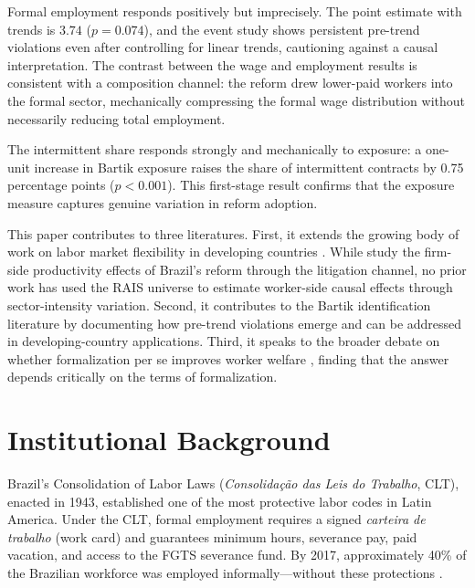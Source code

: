 \documentclass[12pt]{article}
\begin{document}
Formal employment responds positively but imprecisely. The point estimate with trends is $3.74$ ($p = 0.074$), and the event study shows persistent pre-trend violations even after controlling for linear trends, cautioning against a causal interpretation. The contrast between the wage and employment results is consistent with a composition channel: the reform drew lower-paid workers into the formal sector, mechanically compressing the formal wage distribution without necessarily reducing total employment.

The intermittent share responds strongly and mechanically to exposure: a one-unit increase in Bartik exposure raises the share of intermittent contracts by 0.75 percentage points ($p < 0.001$). This first-stage result confirms that the exposure measure captures genuine variation in reform adoption.

This paper contributes to three literatures. First, it extends the growing body of work on labor market flexibility in developing countries \citep{Botero2004, Besley2004, Heckman2004, Djankov2002}. While \citet{HannanPienknagura2025} study the firm-side productivity effects of Brazil's reform through the litigation channel, no prior work has used the RAIS universe to estimate worker-side causal effects through sector-intensity variation. Second, it contributes to the Bartik identification literature \citep{Bartik1991, GoldsmithPinkham2020, BorusyakHullJaravel2022, Adao2019} by documenting how pre-trend violations emerge and can be addressed in developing-country applications. Third, it speaks to the broader debate on whether formalization per se improves worker welfare \citep{LaPortaShleifer2014, Ulyssea2018, Meghir2015}, finding that the answer depends critically on the terms of formalization.

\section{Institutional Background}

Brazil's Consolidation of Labor Laws (\textit{Consolidação das Leis do Trabalho}, CLT), enacted in 1943, established one of the most protective labor codes in Latin America. Under the CLT, formal employment requires a signed \textit{carteira de trabalho} (work card) and guarantees minimum hours, severance pay, paid vacation, and access to the FGTS severance fund. By 2017, approximately 40\% of the Brazilian workforce was employed informally---without these protections \citep{IBGE2018}.
\end{document}
